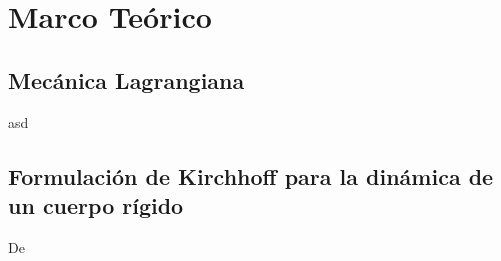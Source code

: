 \section{Marco Teórico}

\subsection{Mecánica Lagrangiana}

asd

\subsection{Formulación de Kirchhoff para la dinámica de un cuerpo rígido}

De
